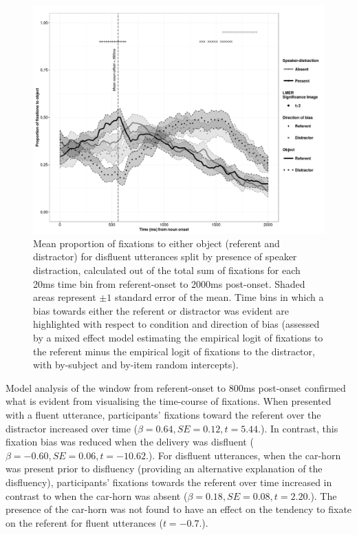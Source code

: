 \documentclass[a4paper,man,natbib]{apa6}
\begin{document}
\begin{figure}[Ht] %
  \centering
	\includegraphics[scale=.5]{disfluent.png}
  \caption{Mean proportion of fixations to either object (referent and distractor) for disfluent utterances split by presence of speaker distraction, calculated out of the total sum of fixations for each 20ms time bin from referent-onset to 2000ms post-onset. Shaded areas represent $\pm 1$ standard error of the mean. Time bins in which a bias towards either the referent or distractor was evident are highlighted with respect to condition and direction of bias (assessed by a mixed effect model estimating the empirical logit of fixations to the referent minus the empirical logit of fixations to the distractor, with by-subject and by-item random intercepts).}
  \label{fig:diseye}
\end{figure}


Model analysis of the window from referent-onset to 800ms post-onset confirmed what is evident from visualising the time-course of fixations. 
When presented with a fluent utterance, participants' fixations toward the referent over the distractor increased over time ($\beta = 0.64, SE = 0.12, t=5.44.$). 
In contrast, this fixation bias was reduced when the delivery was disfluent ($\beta = -0.60, SE = 0.06, t=-10.62.$). 
For disfluent utterances, when the car-horn was present prior to disfluency (providing an alternative explanation of the disfluency), participants' fixations towards the referent over time increased in contrast to when the car-horn was absent ($\beta = 0.18, SE = 0.08, t=2.20.$). 
The presence of the car-horn was not found to have an effect on the tendency to fixate on the referent for fluent utterances ($t=-0.7.$).
\end{document}
